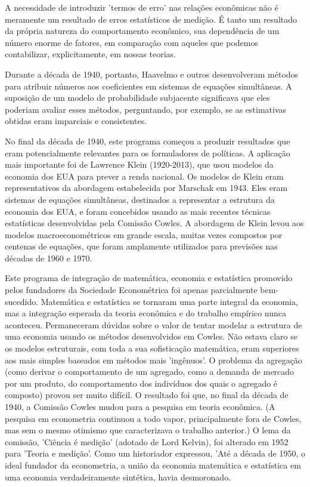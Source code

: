 \documentclass[12pt]{article}
\begin{document}
A necessidade de introduzir 'termos de erro' nas relações econômicas não é meramente um resultado de erros estatísticos de medição. É tanto um resultado da própria natureza do comportamento econômico, sua dependência de um número enorme de fatores, em comparação com aqueles que podemos contabilizar, explicitamente, em nossas teorias.

Durante a década de 1940, portanto, Haavelmo e outros desenvolveram métodos para atribuir números aos coeficientes em sistemas de equações simultâneas. A suposição de um modelo de probabilidade subjacente significava que eles poderiam avaliar esses métodos, perguntando, por exemplo, se as estimativas obtidas eram imparciais e consistentes.

No final da década de 1940, este programa começou a produzir resultados que eram potencialmente relevantes para os formuladores de políticas. A aplicação mais importante foi de Lawrence Klein (1920-2013), que usou modelos da economia dos EUA para prever a renda nacional. Os modelos de Klein eram representativos da abordagem estabelecida por Marschak em 1943. Eles eram sistemas de equações simultâneas, destinados a representar a estrutura da economia dos EUA, e foram concebidos usando as mais recentes técnicas estatísticas desenvolvidas pela Comissão Cowles. A abordagem de Klein levou aos modelos macroeconométricos em grande escala, muitas vezes compostos por centenas de equações, que foram amplamente utilizados para previsões nas décadas de 1960 e 1970.

Este programa de integração de matemática, economia e estatística promovido pelos fundadores da Sociedade Econométrica foi apenas parcialmente bem-sucedido. Matemática e estatística se tornaram uma parte integral da economia, mas a integração esperada da teoria econômica e do trabalho empírico nunca aconteceu. Permaneceram dúvidas sobre o valor de tentar modelar a estrutura de uma economia usando os métodos desenvolvidos em Cowles. Não estava claro se os modelos estruturais, com toda a sua sofisticação matemática, eram superiores aos mais simples baseados em métodos mais 'ingênuos'. O problema da agregação (como derivar o comportamento de um agregado, como a demanda de mercado por um produto, do comportamento dos indivíduos dos quais o agregado é composto) provou ser muito difícil. O resultado foi que, no final da década de 1940, a Comissão Cowles mudou para a pesquisa em teoria econômica. (A pesquisa em econometria continuou a todo vapor, principalmente fora de Cowles, mas sem o mesmo otimismo que caracterizava o trabalho anterior.) O lema da comissão, 'Ciência é medição' (adotado de Lord Kelvin), foi alterado em 1952 para 'Teoria e medição'. Como um historiador expressou, 'Até a década de 1950, o ideal fundador da econometria, a união da economia matemática e estatística em uma economia verdadeiramente sintética, havia desmoronado.
\end{document}
